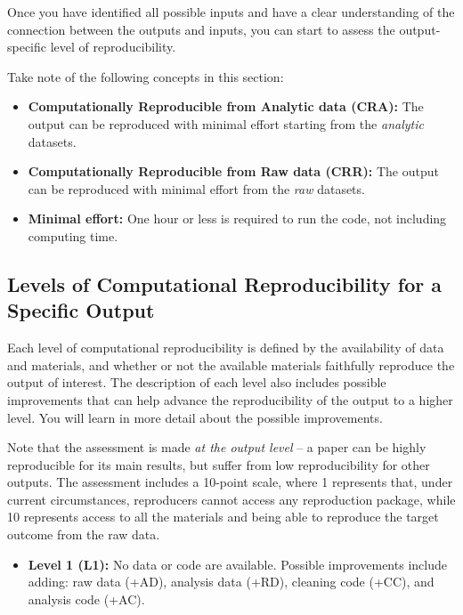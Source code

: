 \documentclass[]{book}
\providecommand{\tightlist}{%
  \setlength{\itemsep}{0pt}\setlength{\parskip}{0pt}}
\begin{document}
Once you have identified all possible inputs and have a clear understanding of the connection between the outputs and inputs, you can start to assess the output-specific level of reproducibility.

Take note of the following concepts in this section:

\begin{itemize}
\item
  \textbf{Computationally Reproducible from Analytic data (CRA):} The output can be reproduced with minimal effort starting from the \emph{analytic} datasets.
\item
  \textbf{Computationally Reproducible from Raw data (CRR):} The output can be reproduced with minimal effort from the \emph{raw} datasets.
\item
  \textbf{Minimal effort:} One hour or less is required to run the code, not including computing time.
\end{itemize}

\hypertarget{levels-of-computational-reproducibility-for-a-specific-output}{%
\subsection{Levels of Computational Reproducibility for a Specific Output}\label{levels-of-computational-reproducibility-for-a-specific-output}}

Each level of computational reproducibility is defined by the availability of data and materials, and whether or not the available materials faithfully reproduce the output of interest. The description of each level also includes possible improvements that can help advance the reproducibility of the output to a higher level. You will learn in more detail about the possible improvements.

Note that the assessment is made \emph{at the output level} -- a paper can be highly reproducible for its main results, but suffer from low reproducibility for other outputs. The assessment includes a 10-point scale, where 1 represents that, under current circumstances, reproducers cannot access any reproduction package, while 10 represents access to all the materials and being able to reproduce the target outcome from the raw data.

\begin{itemize}
\tightlist
\item
  \textbf{Level 1 (L1):} No data or code are available. Possible improvements include adding: raw data (+AD), analysis data (+RD), cleaning code (+CC), and analysis code (+AC).
\end{itemize}
\end{document}
